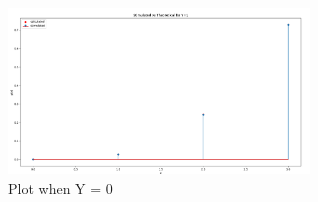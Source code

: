 \documentclass[journal,12pt,twocolumn]{IEEEtran}
\begin{document}
\begin{figure}[htp]
    \centering
    \includegraphics[width=8cm]{assignment2_plot2}
    \caption{Plot when Y = 0}
    \label{fig:2}
\end{figure}
\end{document}
